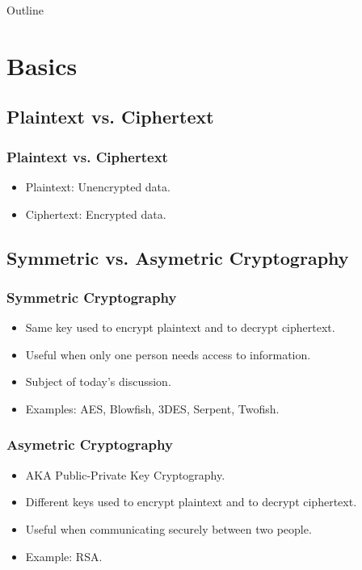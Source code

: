 \documentclass[xcolor={dvipsnames,svgnames},hyperref=dvips]{beamer}
\title[Full-Disk Encryption]{}
\author{Wade Cline}
\date{04 March 2014}
\begin{document}
\begin{frame}
  \titlepage
\end{frame}

\begin{frame}{Outline}
  \tableofcontents
\end{frame}

\section{Basics}\label{section:basics}
	\subsection{Plaintext vs. Ciphertext}
	\begin{frame}
		\frametitle{Plaintext vs. Ciphertext}
		\begin{itemize}
		\item Plaintext: Unencrypted data.
		\item Ciphertext: Encrypted data.
		\end{itemize}
	\end{frame}

	\subsection{Symmetric vs. Asymetric Cryptography}
	\begin{frame}
		\frametitle{Symmetric Cryptography}
		\begin{itemize}
		\item Same key used to encrypt plaintext and to decrypt ciphertext. 
		\item Useful when only one person needs access to information.
		\item Subject of today's discussion.
		\item Examples: AES, Blowfish, 3DES, Serpent, Twofish.
		\end{itemize}
	\end{frame}

	\begin{frame}
		\frametitle{Asymetric Cryptography}
		\begin{itemize}
		\item AKA Public-Private Key Cryptography.
		\item Different keys used to encrypt plaintext and to decrypt ciphertext.
		\item Useful when communicating securely between two people.
		\item Example: RSA.
		\end{itemize}
	\end{frame}
\end{document}
